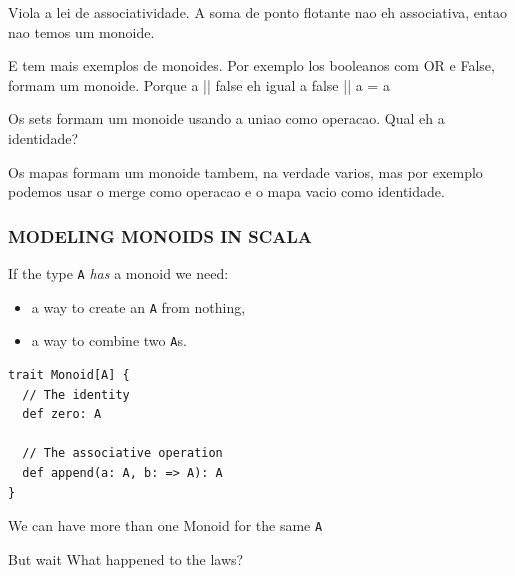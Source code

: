 \documentclass{beamer}
\begin{document}
\begin{frame}
{    \hrulefill

    Viola a lei de associatividade. A soma de ponto flotante nao eh associativa,
    entao nao temos um monoide.

    \hrulefill

   E tem mais exemplos de monoides. Por exemplo los booleanos com OR e False,
   formam um monoide. Porque a || false eh igual a false || a = a

   Os sets formam um monoide usando a uniao como operacao. Qual eh a identidade?

   Os mapas formam um monoide tambem, na verdade varios, mas por exemplo podemos
   usar o merge como operacao e o mapa vacio como identidade.
  }
  \end{frame}

\begin{frame}[fragile]\frametitle{MODELING MONOIDS IN SCALA}
  If the type \texttt{A} \emph{has} a monoid we need:
  \begin{itemize}
    \item a way to create an \texttt{A} from nothing,
    \item a way to combine two \texttt{A}s.
  \end{itemize}
  \pause

  \begin{block}{}
  \begin{lstlisting}
trait Monoid[A] {
  // The identity
  def zero: A

  // The associative operation
  def append(a: A, b: => A): A
}
  \end{lstlisting}
  \end{block}

  \pause

  We can have more than one Monoid for the same \texttt{A}
  \begin{block}{But wait}
    What happened to the laws?
  \end{block}

\end{frame}
\end{document}
